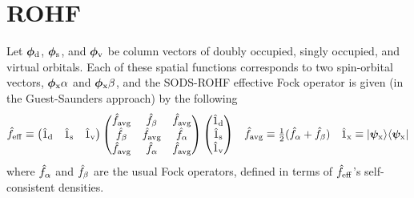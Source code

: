 \documentclass[11pt]{article}
\begin{document}
\section*{ROHF}

Let $\bm\f_\mr{d}$, $\bm\f_\mr{s}$, and $\bm\f_\mr{v}$ be column vectors of doubly occupied, singly occupied, and virtual orbitals.
Each of these spatial functions corresponds to two spin-orbital vectors, $\bm{\f}_\mr{x}\a$ and $\bm{\f}_\mr{x}\b$, and the SODS-ROHF effective Fock operator is given (in the Guest-Saunders approach) by the following
\begin{align}
  \op{f}_\mr{eff}
\equiv
  \ma{
    \op{1}_\mr{d} &
    \op{1}_\mr{s} &
    \op{1}_\mr{v}
  }
  \ma{
    \op{f}_\mr{avg} & \op{f}_\b       &  \op{f}_\mr{avg} \\
    \op{f}_\b       & \op{f}_\mr{avg} &  \op{f}_\a       \\
    \op{f}_\mr{avg} & \op{f}_\a       &  \op{f}_\mr{avg} \\
  }
  \ma{
    \op{1}_\mr{d} \\
    \op{1}_\mr{s} \\
    \op{1}_\mr{v} \\
  }
&&
  \op{f}_\mr{avg}
\equiv
  \tfr{1}{2}
  (
    \op{f}_\a
  +
    \op{f}_\b
  )
&&
  \op{1}_\mr{x}
\equiv
  \kt{\bm\y_\mr{x}}
  \br{\bm\y_\mr{x}}
\end{align}
where $\hat{f}_{\alpha }$ and $\hat{f}_{\beta }$ are the usual Fock operators, defined in terms of $\hat{f}_{\mathrm{eff}}$'s self-consistent densities.
\end{document}
